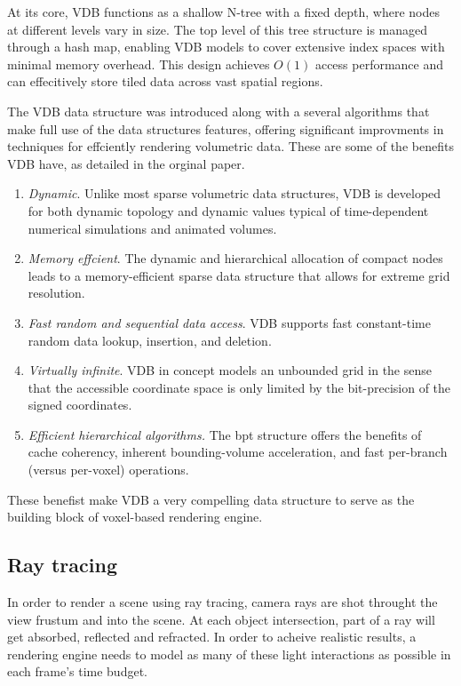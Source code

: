 At its core, VDB functions as a shallow N-tree with a fixed depth, where nodes at different levels vary in size. The top level of this tree structure is managed through a hash map, enabling VDB models to cover extensive index spaces with minimal memory overhead. This design achieves $O(1)$ access performance and can effecitively store tiled data across vast spatial regions.

The VDB data structure was introduced along with a several algorithms that make full use of the data structures features, offering significant improvments in techniques for effciently rendering volumetric data. These are some of the benefits VDB have, as detailed in the orginal paper.
\begin{enumerate}
  \item \emph{Dynamic}. Unlike most sparse volumetric data structures, VDB is developed for both dynamic topology and dynamic values typical of time-dependent numerical simulations and animated volumes.
  \item \emph{Memory effcient}. The dynamic and hierarchical allocation of compact nodes leads to a memory-efficient sparse data structure that allows for extreme grid resolution.
  \item \emph{Fast random and sequential data access}. VDB supports fast constant-time random data lookup, insertion, and deletion.
  \item \emph{Virtually infinite}. VDB in concept models an unbounded grid in the sense that the accessible coordinate space is only limited by the bit-precision of the signed coordinates.
  \item \emph{Efficient hierarchical algorithms.} The \acrshort{bpt} structure offers the benefits of cache coherency, inherent bounding-volume acceleration, and fast per-branch (versus per-voxel) operations.
\end{enumerate}
These benefist make VDB a very compelling data structure to serve as the building block of voxel-based rendering engine.

\subsection{Ray tracing}
In order to render a scene using ray tracing, camera rays are shot throught the view frustum and into the scene. At each object intersection, part of a ray will get absorbed, reflected and refracted. In order to acheive realistic results, a rendering engine needs to model as many of these light interactions as possible in each frame's time budget.

